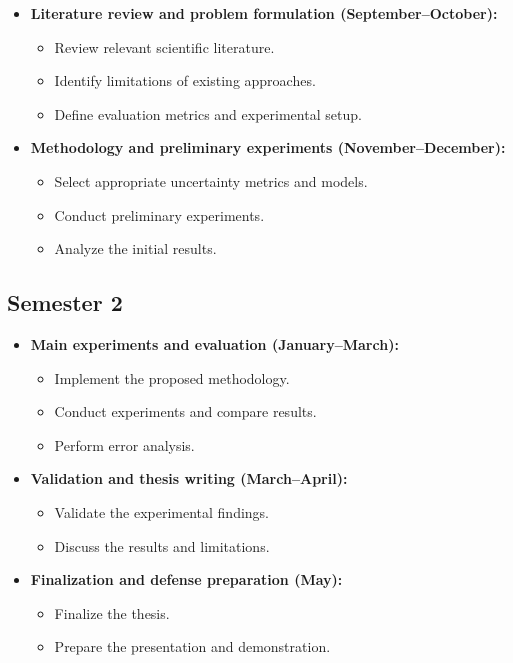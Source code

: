 \documentclass[11pt,a4paper]{article}
\begin{document}
\begin{itemize}

    \item \textbf{Literature review and problem formulation
    (September--October):}

    \begin{itemize}
        \item Review relevant scientific literature.
        \item Identify limitations of existing approaches.
        \item Define evaluation metrics and experimental setup.
    \end{itemize}

    \item \textbf{Methodology and preliminary experiments
    (November--December):}

    \begin{itemize}
        \item Select appropriate uncertainty metrics and models.
        \item Conduct preliminary experiments.
        \item Analyze the initial results.
    \end{itemize}

\end{itemize}

\subsection*{Semester 2}

\begin{itemize}

    \item \textbf{Main experiments and evaluation
    (January--March):}

    \begin{itemize}
        \item Implement the proposed methodology.
        \item Conduct experiments and compare results.
        \item Perform error analysis.
    \end{itemize}

    \item \textbf{Validation and thesis writing
    (March--April):}

    \begin{itemize}
        \item Validate the experimental findings.
        \item Discuss the results and limitations.
    \end{itemize}

    \item \textbf{Finalization and defense preparation (May):}

    \begin{itemize}
        \item Finalize the thesis.
        \item Prepare the presentation and demonstration.
    \end{itemize}

\end{itemize}
\end{document}
